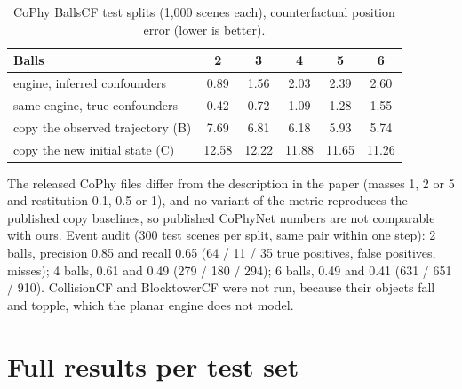 \begin{table}[h]
\caption{CoPhy BallsCF test splits (1,000 scenes each), counterfactual position error (lower is better).}
\label{tab:cophy}
\centering
\small
\begin{tabular}{@{}lccccc@{}}
\toprule
Balls & 2 & 3 & 4 & 5 & 6 \\
\midrule
\sys{} engine, inferred confounders & 0.89 & 1.56 & 2.03 & 2.39 & 2.60 \\
same engine, true confounders & 0.42 & 0.72 & 1.09 & 1.28 & 1.55 \\
copy the observed trajectory (B) & 7.69 & 6.81 & 6.18 & 5.93 & 5.74 \\
copy the new initial state (C) & 12.58 & 12.22 & 11.88 & 11.65 & 11.26 \\
\bottomrule
\end{tabular}
\end{table}

The released CoPhy files differ from the description in the paper (masses 1, 2 or 5 and restitution 0.1, 0.5 or 1), and no variant of the metric reproduces the published copy baselines, so published CoPhyNet numbers are not comparable with ours.
Event audit (300 test scenes per split, same pair within one step): 2 balls, precision 0.85 and recall 0.65 (64 / 11 / 35 true positives, false positives, misses); 4 balls, 0.61 and 0.49 (279 / 180 / 294); 6 balls, 0.49 and 0.41 (631 / 651 / 910).
CollisionCF and BlocktowerCF were not run, because their objects fall and topple, which the planar engine does not model.

\section{Full results per test set}
\label{app:full}

